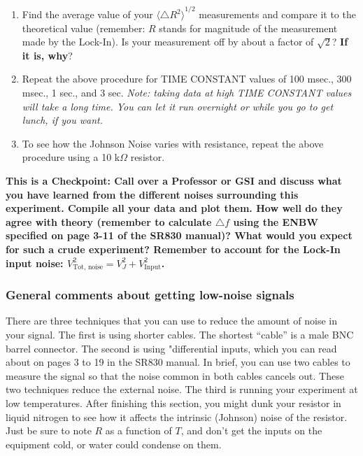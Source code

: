 \documentclass{../lab}
\begin{document}
\begin{enumerate}
    \item Find the average value of your ${\langle \triangle R^2 \rangle}^{1/2}$ measurements and compare it to the theoretical value (remember: $R$ stands for magnitude of the measurement made by the Lock-In). Is your measurement off by about a factor of $\sqrt{2}$? \textbf{If it is, why}?
    
    \item Repeat the above procedure for TIME CONSTANT values of 100 msec., 300 msec., 1 sec., and 3 sec. \emph{Note: taking data at high TIME CONSTANT values will take a long time. You can let it run overnight or while you go to get lunch, if you want.}
    
    \item To see how the Johnson Noise varies with resistance, repeat the above procedure using a 10 k$\Omega$ resistor.

\end{enumerate}

\textbf{This is a Checkpoint:  Call over a Professor or GSI and discuss what you have learned from the different noises surrounding this experiment. Compile all your data and plot them.  How well do they agree with theory (remember to calculate $\triangle f$ using the ENBW specified on page 3-11 of the SR830 manual)? What would you expect for such a crude experiment? Remember to account for the Lock-In input noise: $V_\text{Tot, noise}^2 = V_J^2 + V_\text{Input}^2$.}

\subsubsection{General comments about getting low-noise signals}

There are three techniques that you can use to reduce the amount of noise in your signal. The first is using shorter cables. The shortest ``cable'' is a male BNC barrel connector. The second is using "differential inputs, which you can read about on pages 3 to 19 in the SR830 manual. In brief, you can use two cables to measure the signal so that the noise common in both cables cancels out. These two techniques reduce the external noise. The third is running your experiment at low temperatures. After finishing this section, you might dunk your resistor in liquid nitrogen to see how it affects the intrinsic (Johnson) noise of the resistor. Just be sure to note $R$ as a function of $T$, and don't get the inputs on the equipment cold, or water could condense on them.
\end{document}
